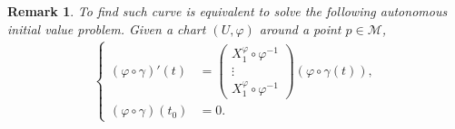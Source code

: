 \documentclass[10pt]{article}
\newtheorem{remark}{Remark}[section]
\newcommand{\M}[0]{\mathcal{M}}
\begin{document}
\begin{remark}
  To find such curve is equivalent to solve the following autonomous initial value problem. Given a chart $(U,\varphi)$ around a point $p\in\M$, 
  \begin{align*}
    \begin{cases}
      (\varphi\circ\gamma)'(t) &= \begin{pmatrix}
      X_1^\varphi\circ\varphi^{-1}\\
      \vdots\\
      X_1^\varphi\circ\varphi^{-1}
    \end{pmatrix}
    (\varphi\circ \gamma(t)),\\
    (\varphi\circ\gamma)(t_0) &= 0.
    \end{cases}
  \end{align*}
\end{remark}
\end{document}
